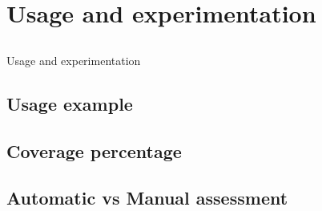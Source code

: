 \chapter{Usage and experimentation} \label{chap:usage}

\section*{}

Usage and experimentation

\section{Usage example} \label{sec:usageexample}


\section{Coverage percentage} \label{sec:coverage}

	
\section{Automatic vs Manual assessment} \label{sec:automatic}
